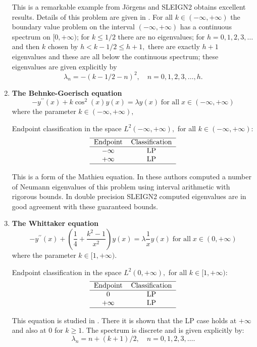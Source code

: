 \documentclass[12pt]{amsart}%
\theoremstyle{plain}
\numberwithin{equation}{section}
\begin{document}
\begin{enumerate}
This is a remarkable example from J\"{o}rgens and SLEIGN2 obtains excellent
results. Details of this problem are given in \cite[Part II, Section 10]{J}.
For all $k\in(-\infty,+\infty)$ the boundary value problem on the interval
$(-\infty,+\infty)$ has a continuous spectrum on $[0,+\infty)$; for $k\leq1/2$
there are no eigenvalues; for $h=0,1,2,3,\ldots$ and then $k$ chosen by
$h<k-1/2\leq h+1,$ there are exactly $h+1$ eigenvalues and these are all below
the continuous spectrum; these eigenvalues are given explicitly by
\[
\lambda_{n}=-(k-1/2-n)^{2},\quad n=0,1,2,3,\ldots,h.
\]

\item \textbf{The Behnke-Goerisch equation}%
\[
-y^{\prime\prime}(x)+k\cos^{2}(x)y(x)=\lambda y(x)\;\text{for all}%
\;x\in(-\infty,+\infty)
\]
where the parameter $k\in(-\infty,+\infty),$

Endpoint classification in the space $L^{2}(-\infty,+\infty),$ for all
$k\in(-\infty,+\infty)$:%
\[%
\begin{tabular}
[c]{cc}\hline
Endpoint & Classification\\\hline
$-\infty$ & LP\\
$+\infty$ & LP\\\hline
\end{tabular}
\]

This is a form of the Mathieu equation. In \cite{BG} these authors computed a
number of Neumann eigenvalues of this problem using interval arithmetic with
rigorous bounds. In double precision SLEIGN2 computed eigenvalues are in good
agreement with these guaranteed bounds.

\item \textbf{The Whittaker equation}%
\[
-y^{\prime\prime}(x)+\left(  \frac{1}{4}+\frac{k^{2}-1}{x^{2}}\right)
y(x)=\lambda\frac{1}{x}y(x)\;\text{for all}\;x\in(0,+\infty)
\]
where the parameter $k\in\lbrack1,+\infty).$

Endpoint classification in the space $L^{2}(0,+\infty),$ for all $k\in
\lbrack1,+\infty)$:%
\[%
\begin{tabular}
[c]{cc}\hline
Endpoint & Classification\\\hline
$0$ & LP\\
$+\infty$ & LP\\\hline
\end{tabular}
\]

This equation is studied in \cite[Part II, Section 10]{J}. There it is shown
that the LP case holds at $+\infty$ and also at $0$ for $k\geq1$. The spectrum
is discrete and is given explicitly by:
\[
\lambda_{n}=n+(k+1)/2,\quad n=0,1,2,3,\ldots.
\]


\end{enumerate}
\end{document}
